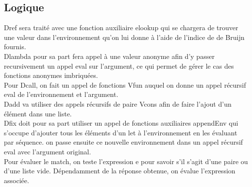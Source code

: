 \documentclass{article}
\begin{document}
\subsection{Logique}

Dref sera traité avec une fonction auxiliaire elookup qui se chargera de trouver une valeur dans l'environnement qu'on lui donne à l'aide de l'indice de de Bruijn fournis.\\
Dlambda pour sa part fera appel à une valeur anonyme afin d'y passer recursivement un appel eval sur l'argument, ce qui permet de gérer le cas des fonctions anonymes imbriquées.\\
Pour Dcall, on fait un appel de fonctions Vfun auquel on donne un appel récursif eval de l'environnement et l'argument.\\
Dadd va utiliser des appels récursifs de paire Vcons afin de faire l'ajout d'un élément dans une liste.\\
Dfix doit pour sa part utiliser un appel de fonctions auxiliaires appendEnv qui s'occupe d'ajouter tous les éléments d'un let à l'environnement en les évaluant par séquence. on passe ensuite ce nouvelle environnement dans un appel récursif eval avec l'argument original.\\
Pour évaluer le match, on teste l'expression e pour savoir s'il s'agit d'une paire ou d'une liste vide. Dépendamment de la réponse obtenue, on évalue l'expression associée.
\end{document}
